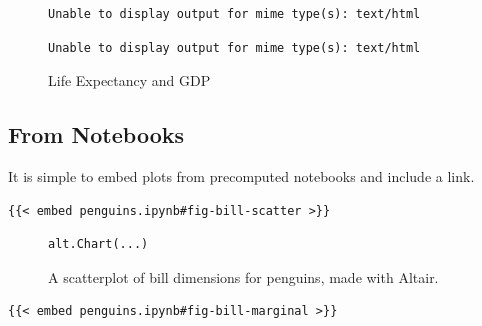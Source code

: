 \documentclass[
  letterpaper,
  DIV=11,
  numbers=noendperiod,
  oneside]{scrartcl}
\begin{document}
\begin{figure}

\begin{minipage}[t]{0.50\linewidth}

{\centering 

\begin{verbatim}
Unable to display output for mime type(s): text/html
\end{verbatim}

}

\end{minipage}%
%
\begin{minipage}[t]{0.50\linewidth}

{\centering 

\begin{verbatim}
Unable to display output for mime type(s): text/html
\end{verbatim}

}

\end{minipage}%

\caption{\label{fig-gapminder}Life Expectancy and GDP}

\end{figure}

\hypertarget{from-notebooks}{%
\subsection{From Notebooks}\label{from-notebooks}}

It is simple to embed plots from precomputed notebooks and include a
link.

\begin{verbatim}
{{< embed penguins.ipynb#fig-bill-scatter >}}
\end{verbatim}

\begin{figure}

{\centering 

\begin{verbatim}
alt.Chart(...)
\end{verbatim}

}

\caption{\label{fig-bill-scatter}A scatterplot of bill dimensions for
penguins, made with Altair.}

\end{figure}

\begin{verbatim}
{{< embed penguins.ipynb#fig-bill-marginal >}}
\end{verbatim}
\end{document}
